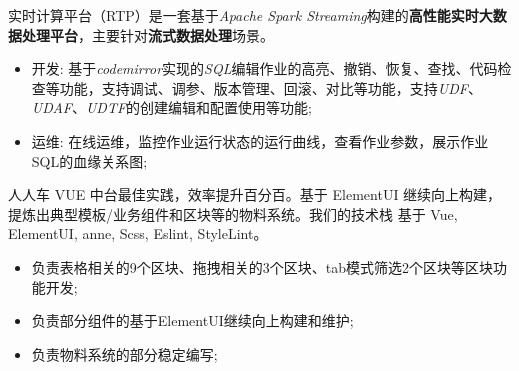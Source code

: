 \documentclass{resume}
\begin{document}
\begin{onehalfspacing}
实时计算平台（RTP）是一套基于\textit{Apache Spark Streaming}构建的\textbf{高性能实时大数据处理平台}，主要针对\textbf{流式数据处理}场景。
\begin{itemize}
  \item 开发: 基于\textit{codemirror}实现的\textit{SQL}编辑作业的高亮、撤销、恢复、查找、代码检查等功能，支持调试、调参、版本管理、回滚、对比等功能，支持\textit{UDF}、\textit{UDAF}、\textit{UDTF}的创建编辑和配置使用等功能;
  \item 运维: 在线运维，监控作业运行状态的运行曲线，查看作业参数，展示作业SQL的血缘关系图;
\end{itemize}
\end{onehalfspacing}




\begin{onehalfspacing}
人人车 VUE 中台最佳实践，效率提升百分百。基于 ElementUI 继续向上构建，提炼出典型模板/业务组件和区块等的物料系统。我们的技术栈 基于 Vue, ElementUI, anne, Scss, Eslint, StyleLint。
\begin{itemize}
  \item 负责表格相关的9个区块、拖拽相关的3个区块、tab模式筛选2个区块等区块功能开发;
  \item 负责部分组件的基于ElementUI继续向上构建和维护;
  \item 负责物料系统的部分稳定编写;
\end{itemize}
\end{onehalfspacing}
\end{document}
